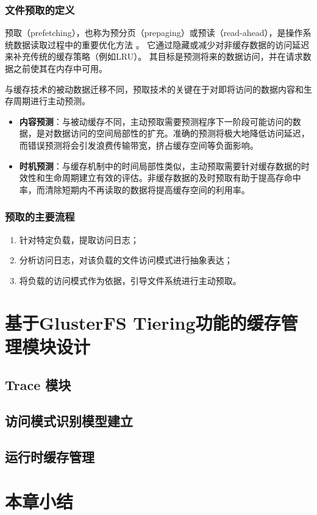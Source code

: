 \subsubsection*{文件预取的定义}
预取（prefetching），也称为预分页（prepaging）或预读（read-ahead），是操作系统数据读取过程中的重要优化方法
\cite{Reducing_File_System_Latency_using_a_Predictive_Approach}
\cite{Group_based_management_of_distributed_file_caches}
\cite{A_data_mining_algorithm_for_generalized_web_prefetching}
。 它通过隐藏或减少对非缓存数据的访问延迟来补充传统的缓存策略（例如LRU）。 其目标是预测将来的数据访问，并在请求数据之前使其在内存中可用。

与缓存技术的被动数据迁移不同，预取技术的关键在于对即将访问的数据内容和生存周期进行主动预测。
\begin{itemize}
\item \textbf{内容预测}：与被动缓存不同，主动预取需要预测程序下一阶段可能访问的数据，是对数据访问的空间局部性的扩充。准确的预测将极大地降低访问延迟，而错误预测将会引发浪费传输带宽，挤占缓存空间等负面影响。
\item \textbf{时机预测}：与缓存机制中的时间局部性类似，主动预取需要针对缓存数据的时效性和生命周期建立有效的评估。非缓存数据的及时预取有助于提高存命中率，而清除短期内不再读取的数据将提高缓存空间的利用率。
\end{itemize}

\subsubsection*{预取的主要流程}
\begin{enumerate}
\item 针对特定负载，提取访问日志；
\item 分析访问日志，对该负载的文件访问模式进行抽象表达；
\item 将负载的访问模式作为依据，引导文件系统进行主动预取。
\end{enumerate}

\section{基于GlusterFS Tiering功能的缓存管理模块设计}
\subsection{Trace 模块}
\subsection{访问模式识别模型建立}
\subsection{运行时缓存管理}


\section{本章小结}